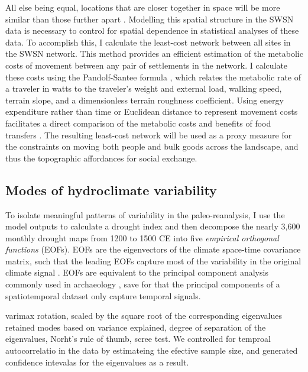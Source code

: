 \documentclass[11pt]{wlscirep}
\begin{document}
All else being equal, locations that are closer together in space will be more similar than those further apart \cite{Tobler1970}. Modelling this spatial structure in the SWSN data is necessary to control for spatial dependence in statistical analyses of these data. To accomplish this, I calculate the least-cost network between all sites in the SWSN network. This method provides an efficient estimation of the metabolic costs of movement between any pair of settlements in the network. I calculate these costs using the Pandolf-Santee formula \cite{White2012}, which relates the metabolic rate of a traveler in watts to the traveler's weight and external load, walking speed, terrain slope, and a dimensionless terrain roughness coefficient. Using energy expenditure rather than time or Euclidean distance to represent movement costs facilitates a direct comparison of the metabolic costs and benefits of food transfers  \cite{Drennan1984}. The resulting least-cost network will be used as a proxy measure for the constraints on moving both people and bulk goods across the landscape, and thus the topographic affordances for social exchange.



\subsection*{Modes of hydroclimate variability}
To isolate meaningful patterns of variability in the paleo-reanalysis, I use the model outputs to calculate a drought index and then decompose the nearly 3,600 monthly drought maps from 1200 to 1500 CE into five \textit{empirical orthogonal functions} (EOFs). EOFs are the eigenvectors of the climate space-time covariance matrix, such that the leading EOFs capture most of the variability in the original climate signal \cite{Lorenz1956EmpiricalPrediction}. EOFs are equivalent to the principal component analysis commonly used in archaeology \cite[e.g.]{Dean1996DemographyStress}, save for that the principal components of a spatiotemporal dataset only capture temporal signals.

varimax rotation, scaled by the square root of the corresponding eigenvalues
retained modes based on variance explained, degree of separation of the eigenvalues, Norht's rule of thumb, scree test. We controlled for temproal autocorrelatio in the data by estimateing the efective sample size, and generated confidence intevalas for the eigenvalues as a result.
\end{document}
